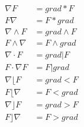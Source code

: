 \begin{align*}
  \nabla F &= grad*F \\
  F \nabla &= F*grad \\
  \nabla \wedge F &= grad \wedge F \\
  F \wedge \nabla &= F \wedge grad \\
  \nabla \cdot F &= grad|F \\
  F \cdot \nabla F &= F|grad \\
  \nabla \lfloor F &= grad  <  F \\
  F \lfloor \nabla &= F  <  grad \\
  \nabla \rfloor F &= grad  >  F \\
  F \rfloor \nabla &= F  >  grad
\end{align*}